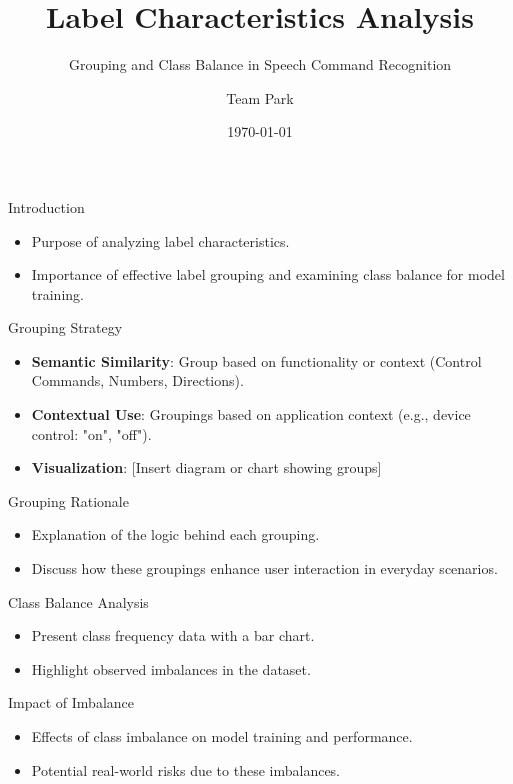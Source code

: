 \documentclass{beamer}
\title{Label Characteristics Analysis}
\subtitle{Grouping and Class Balance in Speech Command Recognition}
\author{Team Park}
\institute{JKU \\ MLPC}
\date{\today}
\begin{document}
\begin{frame}
  \titlepage
\end{frame}

\begin{frame}{Introduction}
  \begin{itemize}
    \item Purpose of analyzing label characteristics.
    \item Importance of effective label grouping and examining class balance for model training.
  \end{itemize}
\end{frame}

\begin{frame}{Grouping Strategy}
  \begin{itemize}
    \item \textbf{Semantic Similarity}: Group based on functionality or context (Control Commands, Numbers, Directions).
    \item \textbf{Contextual Use}: Groupings based on application context (e.g., device control: "on", "off").
    \item \textbf{Visualization}: [Insert diagram or chart showing groups]
  \end{itemize}
\end{frame}

\begin{frame}{Grouping Rationale}
  \begin{itemize}
    \item Explanation of the logic behind each grouping.
    \item Discuss how these groupings enhance user interaction in everyday scenarios.
  \end{itemize}
\end{frame}

\begin{frame}{Class Balance Analysis}
  \begin{itemize}
    \item Present class frequency data with a bar chart.
    \item Highlight observed imbalances in the dataset.
  \end{itemize}
\end{frame}

\begin{frame}{Impact of Imbalance}
  \begin{itemize}
    \item Effects of class imbalance on model training and performance.
    \item Potential real-world risks due to these imbalances.
  \end{itemize}
\end{frame}
\end{document}
